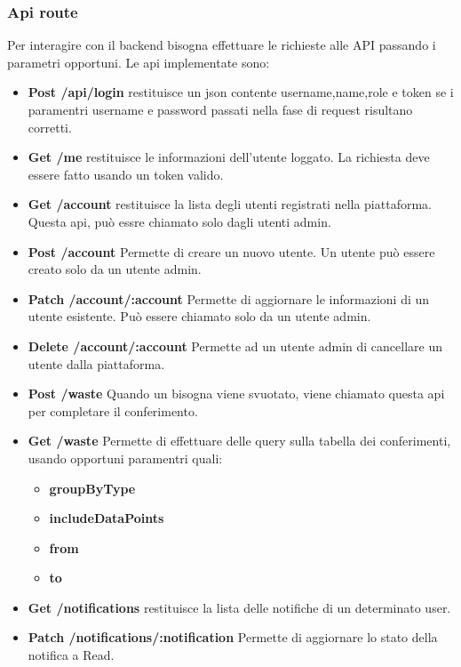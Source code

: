 \documentclass{report}
\begin{document}
\subsubsection{Api route}
Per interagire con il backend bisogna effettuare le richieste alle API passando i parametri opportuni. Le api implementate sono:
\begin{itemize}
    \item \textbf{Post /api/login }restituisce un json contente username,name,role e token se i paramentri username e password passati
    nella fase di request risultano corretti.
    \item \textbf{Get /me }restituisce le informazioni dell'utente loggato. La richiesta deve essere fatto usando un token valido.
    \item \textbf{Get /account } restituisce la lista degli utenti registrati nella piattaforma. Questa api, può essre chiamato solo dagli utenti admin.
    \item \textbf{Post /account } Permette di creare un nuovo utente. Un utente può essere creato solo da un utente admin.
    \item \textbf{Patch /account/:account } Permette di aggiornare le informazioni di un utente esistente. Può essere chiamato solo da un utente admin.
    \item \textbf{Delete /account/:account } Permette ad un utente admin di cancellare un utente dalla piattaforma.
    \item \textbf{Post /waste } Quando un bisogna viene svuotato, viene chiamato questa api per completare il conferimento.
    \item \textbf{Get /waste} Permette di effettuare delle query sulla tabella dei conferimenti, usando opportuni paramentri quali:
        \begin{itemize}
            \item \textbf{groupByType}
            \item \textbf{includeDataPoints}
            \item \textbf{from}
            \item \textbf{to}
        \end{itemize}
    \item \textbf{Get /notifications } restituisce la lista delle notifiche di un determinato user.
    \item \textbf{Patch /notifications/:notification } Permette di aggiornare lo stato della notifica a Read.
\end{itemize}
\end{document}
